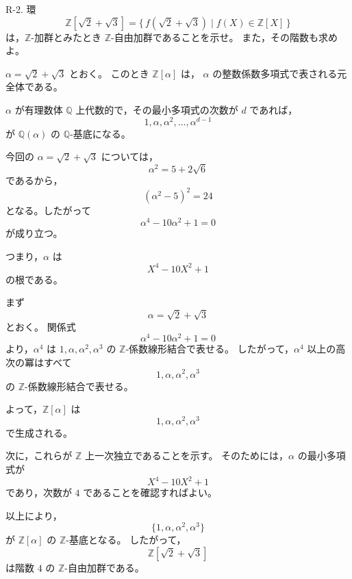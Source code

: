 
\begin{exercise}
		R-2. 環
		\[
		\mathbb{Z}[\sqrt{2}+\sqrt{3}]
		=
		\{\, f(\sqrt{2}+\sqrt{3}) \mid f(X)\in\mathbb{Z}[X] \,\}
		\]
		は，$\mathbb{Z}$-加群とみたとき $\mathbb{Z}$-自由加群であることを示せ。
		また，その階数も求めよ。
	\end{exercise}
	
	\begin{background}
		$\alpha=\sqrt{2}+\sqrt{3}$ とおく。
		このとき $\mathbb{Z}[\alpha]$ は，
		$\alpha$ の整数係数多項式で表される元全体である。
		
		$\alpha$ が有理数体 $\mathbb{Q}$ 上代数的で，その最小多項式の次数が $d$ であれば，
		\[
		1,\alpha,\alpha^2,\dots,\alpha^{d-1}
		\]
		が $\mathbb{Q}(\alpha)$ の $\mathbb{Q}$-基底になる。
		
		今回の $\alpha=\sqrt{2}+\sqrt{3}$ については，
		\[
		\alpha^2=5+2\sqrt{6}
		\]
		であるから，
		\[
		(\alpha^2-5)^2=24
		\]
		となる。したがって
		\[
		\alpha^4-10\alpha^2+1=0
		\]
		が成り立つ。
		
		つまり，$\alpha$ は
		\[
		X^4-10X^2+1
		\]
		の根である。
	\end{background}
	
	\begin{strategy}
		まず
		\[
		\alpha=\sqrt{2}+\sqrt{3}
		\]
		とおく。
		関係式
		\[
		\alpha^4-10\alpha^2+1=0
		\]
		より，$\alpha^4$ は $1,\alpha,\alpha^2,\alpha^3$ の
		$\mathbb{Z}$-係数線形結合で表せる。
		したがって，$\alpha^4$ 以上の高次の冪はすべて
		\[
		1,\alpha,\alpha^2,\alpha^3
		\]
		の $\mathbb{Z}$-係数線形結合で表せる。
		
		よって，$\mathbb{Z}[\alpha]$ は
		\[
		1,\alpha,\alpha^2,\alpha^3
		\]
		で生成される。
		
		次に，これらが $\mathbb{Z}$ 上一次独立であることを示す。
		そのためには，$\alpha$ の最小多項式が
		\[
		X^4-10X^2+1
		\]
		であり，次数が $4$ であることを確認すればよい。
		
		以上により，
		\[
		\{1,\alpha,\alpha^2,\alpha^3\}
		\]
		が $\mathbb{Z}[\alpha]$ の $\mathbb{Z}$-基底となる。
		したがって，
		\[
		\mathbb{Z}[\sqrt{2}+\sqrt{3}]
		\]
		は階数 $4$ の $\mathbb{Z}$-自由加群である。
	\end{strategy}